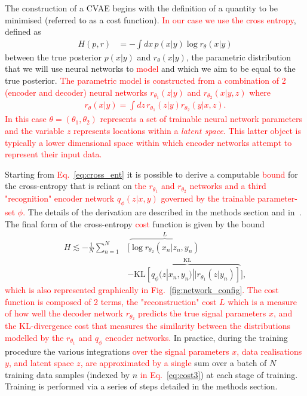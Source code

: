 \documentclass[%
showpacs,
 amsmath,amssymb,
 aps,
 twocolumn,
 prl,
 reprint,
floatfix,
]{revtex4-1}
\newcommand{\new}[1]{\textcolor{red}{#1}}
\begin{document}
%
%
The construction of a \ac{CVAE} begins with the definition of a quantity to be
minimised (referred to as a cost function). \new{In our case we use the cross
entropy}, defined as
%
\begin{align}\label{eq:cross_ent} 
H(p,r) &= -\int dx\, p(x|y) \log r_{\theta}(x|y) 
\end{align}
%
between the true posterior $p(x|y)$ and $r_{\theta}(x|y)$, the parametric
distribution that we will use neural networks to \new{model} and which we aim
to be equal to the true posterior. \new{The parametric model is constructed from a
combination of 2 (encoder and decoder) neural networks $r_{\theta_1}(z|y)$ and
$r_{\theta_2}(x|y,z)$ where
%
\begin{align}\label{eq:approx_post}
r_{\theta}(x|y) = \int dz\,r_{\theta_1}(z|y)r_{\theta_2}(y|x,z).
\end{align}
%
In this case $\theta=(\theta_1,\theta_2)$ represents a set of trainable neural
network parameters and the variable $z$ represents locations within a
\emph{latent space}. This latter object is typically a lower dimensional space
within which encoder networks attempt to represent their input data.}

Starting from \new{Eq.~\ref{eq:cross_ent}} it is possible to derive a
computable \new{bound} for the cross-entropy that is reliant on \new{the
$r_{\theta_1}$ and $r_{\theta_2}$ networks and a third "recognition" encoder network
$q_{\phi}(z|x,y)$ governed by the trainable parameter-set $\phi$.} The details
of the derivation are described in the methods section and
in~\cite{1904.06264}. The final form of the cross-entropy \new{cost} function is
given by the bound
%
\begin{align}\label{eq:cost3} H \lesssim
-\frac{1}{N}\sum_{n=1}^{N}&\Big[\overbrace{\log
r_{\theta_{2}}(x_{n}|z_{n},y_{n})}^{L}\nonumber\\
&-\overbrace{\text{KL}\left[q_{\phi}(z|x_{n},y_{n})||r_{\theta_{1}}(z|y_{n})\right]}^{\text{KL}}\Big],
\end{align}
%
\new{which is also represented graphically in Fig.~\ref{fig:network_config}. The cost
function is composed of 2 terms, the "reconstruction" cost $L$ which is a
measure of how well the decoder network $r_{\theta_2}$ predicts the true signal
parameters $x$, and the \ac{KL}-divergence cost that measures the similarity
between the distributions modelled by the $r_{\theta_1}$ and $q_{\phi}$ encoder
networks.} In practice, during the training procedure the various integrations
\new{over the signal parameters $x$, data realisations $y$, and latent space $z$,
are approximated by a single} sum over a batch of $N$ training data samples
(indexed by $n$ \new{in Eq.~\ref{eq:cost3}}) at each stage of training. Training is
performed via a series of steps detailed in the methods section.
\end{document}
